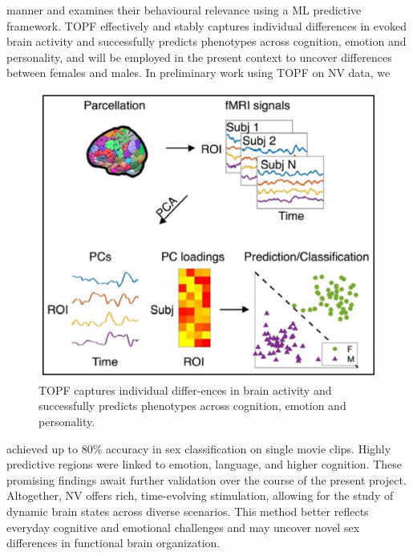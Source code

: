 \documentclass[11pt,a4paper]{article}
\begin{document}
manner and examines their behavioural relevance using a ML predictive framework. 
TOPF effectively and stably captures individual differences in evoked brain activity and successfully predicts phenotypes across 
cognition, emotion and personality, and will be employed in the present context to uncover differences between 
females and males. In preliminary work using TOPF \parencite{liTopographybasedPredictiveFramework2023a} on NV data, we 
\begin{figure} %
  \vspace{-10pt} %
  \includegraphics[width=\linewidth]{topf_neu.png}
  \caption{TOPF captures individual differ-ences in brain activity and successfully predicts phenotypes across cognition, emotion and personality.}
  \label{fig:topf}
\end{figure}
achieved up to 80\% accuracy in sex classification on single movie clips. Highly predictive regions were 
linked to emotion, language, and higher cognition. These promising findings await further validation over 
the course of the present project. Altogether, NV offers rich, time-evolving stimulation, allowing for the 
study of dynamic brain states across diverse scenarios. This method better reflects everyday cognitive and 
emotional challenges and may uncover novel sex differences in functional brain organization.
\par\vspace{-1\parskip}\noindent
\end{document}
